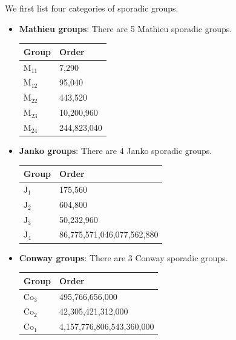We first list four categories of sporadic groups.
\begin{itemize}
    \item \textbf{Mathieu groups}: There are 5 Mathieu sporadic groups.
    \begin{table}[h]
        \centering
        \begin{tabular}{|l|l|}
            \hline
            \textbf{Group}    & \textbf{Order} \\ \hline
            $\mathrm{M}_{11}$ & 7,290          \\ \hline
            $\mathrm{M}_{12}$ & 95,040         \\ \hline
            $\mathrm{M}_{22}$ & 443,520        \\ \hline
            $\mathrm{M}_{23}$ & 10,200,960     \\ \hline
            $\mathrm{M}_{24}$ & 244,823,040    \\ \hline
        \end{tabular}
    \end{table}

    \item \textbf{Janko groups}: There are 4 Janko sporadic groups.
    \begin{table}[h]
        \centering
        \begin{tabular}{|l|l|}
            \hline
            \textbf{Group} & \textbf{Order}             \\ \hline
            $\mathrm{J}_1$ & 175,560                    \\ \hline
            $\mathrm{J}_2$ & 604,800                    \\ \hline
            $\mathrm{J}_3$ & 50,232,960                 \\ \hline
            $\mathrm{J}_4$ & 86,775,571,046,077,562,880 \\ \hline
        \end{tabular}
    \end{table}

    \item \textbf{Conway groups}: There are 3 Conway sporadic groups.
    \begin{table}[h]
        \centering
        \begin{tabular}{|l|l|}
            \hline
            \textbf{Group}  & \textbf{Order}            \\ \hline
            $\mathrm{Co}_3$ & 495,766,656,000           \\ \hline
            $\mathrm{Co}_2$ & 42,305,421,312,000        \\ \hline
            $\mathrm{Co}_1$ & 4,157,776,806,543,360,000 \\ \hline
        \end{tabular}
    \end{table}


\end{itemize}
